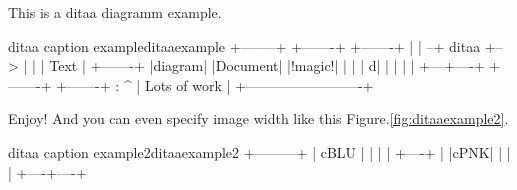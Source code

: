 \documentclass[11pt]{article}
\begin{document}
    This is a ditaa diagramm example.
    \begin{ditaa}{ditaa caption example}{ditaaexample}
        +--------+   +-------+    +-------+
        |        | --+ ditaa +--> |       |
        |  Text  |   +-------+    |diagram|
        |Document|   |!magic!|    |       |
        |     {d}|   |       |    |       |
        +---+----+   +-------+    +-------+
            :                         ^
            |       Lots of work      |
            +-------------------------+
    \end{ditaa}
    Enjoy!
    And you can even specify image width like this Figure.\ref{fig:ditaaexample2}.
     \begin{ditaa}[6cm]{ditaa caption example2}{ditaaexample2}
       +---------+
       | cBLU    |
       |         |
       |    +----+
       |    |cPNK|
       |    |    |
       +----+----+
    \end{ditaa}
\end{document}
